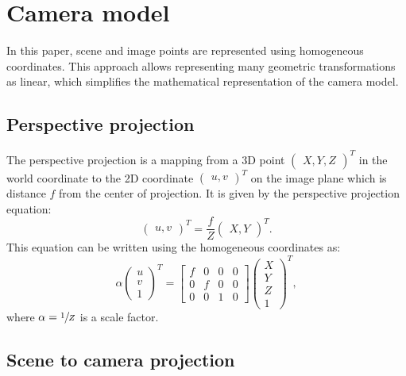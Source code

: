 \section{Camera model}\label{sec:camera_model}

In this paper, scene and image points are represented using homogeneous
coordinates. This approach allows representing many geometric transformations as
linear, which simplifies the mathematical representation of the camera model.

\subsection{Perspective projection}\label{sub:perspective_projection}

The perspective projection is a mapping from a 3D point \(\begin{pmatrix}
	X, Y, Z
\end{pmatrix}^{T}\)
in the world coordinate
to the 2D coordinate \(\begin{pmatrix}
	u, v
\end{pmatrix}^{T}\)
on the image plane which is distance \(f\) from the center
of projection. It is given by the perspective projection equation:
\[
	\begin{pmatrix}
		u, v
	\end{pmatrix}^{T} = \frac{f}{Z} \begin{pmatrix}
		X, Y
	\end{pmatrix}^{T}.
\]
This equation can be written using the homogeneous coordinates as:
\begin{equation} \label{eq:perspective_projection}
	\alpha \begin{pmatrix}
		u \\ v \\ 1
	\end{pmatrix}^{T} = \begin{bmatrix}
		f & 0 & 0 & 0 \\
		0 & f & 0 & 0 \\
		0 & 0 & 1 & 0
	\end{bmatrix} \begin{pmatrix}
		X \\ Y \\ Z \\ 1
	\end{pmatrix}^{T},
\end{equation}
where \(\alpha = \sfrac{1}{Z}\) is a scale factor.

\subsection{Scene to camera projection}\label{sub:scene_to_camera_projection}

